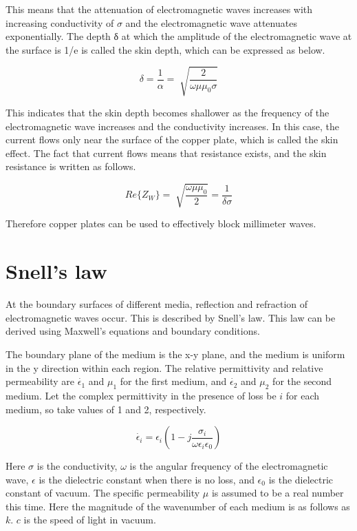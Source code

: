 \documentclass[a4paper,12pt]{report}
\begin{document}
This means that the attenuation of electromagnetic waves increases with increasing conductivity of $\sigma$
and the electromagnetic wave attenuates exponentially.
The depth δ at which the amplitude of the electromagnetic wave
at the surface is 1/e is called the skin depth, which can be expressed as below.

\begin{equation}
  \delta = \frac{1}{\alpha} = \sqrt[]{\frac{2}{\omega\mu\mu_0\sigma}}
\end{equation}

This indicates that the skin depth becomes shallower
as the frequency of the electromagnetic wave increases and the conductivity increases.
In this case, the current flows only near the surface of the copper plate,
which is called the skin effect.
The fact that current flows means that resistance exists,
and the skin resistance is written as follows.

\begin{equation}
  Re\{Z_W\} = \sqrt[]{\frac{\omega\mu\mu_0}{2}} = \frac{1}{\delta\sigma}
\end{equation}

Therefore copper plates can be used to effectively block millimeter waves.

\section{Snell's law}

At the boundary surfaces of different media, reflection and refraction of electromagnetic waves occur.
This is described by Snell's law.
This law can be derived using Maxwell's equations and boundary conditions.

The boundary plane of the medium is the x-y plane,
and the medium is uniform in the y direction within each region.
The relative permittivity and relative permeability are
$\dot{\epsilon_1}$ and $\mu_1$ for the first medium, and
$\dot{\epsilon_2}$ and $\mu_2$ for the second medium.
Let the complex permittivity in the presence of loss be
$i$ for each medium, so take values of 1 and 2, respectively.


\begin{equation}
  \dot{\epsilon_i} = \epsilon_i(1 - j\frac{\sigma_i}{\omega\epsilon_i\epsilon_0})
\end{equation}

Here $\sigma$ is the conductivity,
$\omega$ is the angular frequency of the electromagnetic wave,
$\epsilon$ is the dielectric constant when there is no loss, and
$\epsilon_0$ is the dielectric constant of vacuum.
The specific permeability $\mu$ is assumed to be a real number this time.
Here the magnitude of the wavenumber of each medium is as follows as $k$.
$c$ is the speed of light in vacuum.
\end{document}
